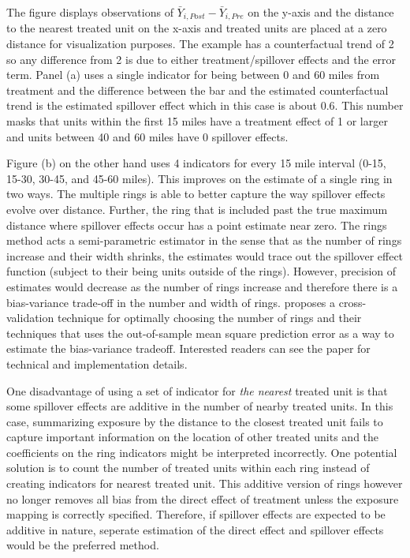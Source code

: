\documentclass[11pt]{article}
\begin{document}
\begin{figure}[tb!]
\end{figure}

The figure displays observations of $\bar{Y}_{i,Post} - \bar{Y}_{i,Pre}$ on the y-axis and the distance to the nearest treated unit on the x-axis and treated units are placed at a zero distance for visualization purposes. The example has a counterfactual trend of 2 so any difference from 2 is due to either treatment/spillover effects and the error term. Panel (a) uses a single indicator for being between 0 and 60 miles from treatment and the difference between the bar and the estimated counterfactual trend is the estimated spillover effect which in this case is about 0.6. This number masks that units within the first 15 miles have a treatment effect of 1 or larger and units between 40 and 60 miles have 0 spillover effects. 

Figure (b) on the other hand uses 4 indicators for every 15 mile interval (0-15, 15-30, 30-45, and 45-60 miles). This improves on the estimate of a single ring in two ways. The multiple rings is able to better capture the way spillover effects evolve over distance. Further, the ring that is included past the true maximum distance where spillover effects occur has a point estimate near zero. The rings method acts a semi-parametric estimator in the sense that as the number of rings increase and their width shrinks, the estimates would trace out the spillover effect function (subject to their being units outside of the rings). However, precision of estimates would decrease as the number of rings increase and therefore there is a bias-variance trade-off in the number and width of rings. \citet{Clarke_2017} proposes a cross-validation technique for optimally choosing the number of rings and their techniques that uses the out-of-sample mean square prediction error as a way to estimate the bias-variance tradeoff. Interested readers can see the paper for technical and implementation details.

One disadvantage of using a set of indicator for \textit{the nearest} treated unit is that some spillover effects are additive in the number of nearby treated units. In this case, summarizing exposure by the distance to the closest treated unit fails to capture important information on the location of other treated units and the coefficients on the ring indicators might be interpreted incorrectly. One potential solution is to count the number of treated units within each ring instead of creating indicators for nearest treated unit. This additive version of rings however no longer removes all bias from the direct effect of treatment unless the exposure mapping is correctly specified. Therefore, if spillover effects are expected to be additive in nature, seperate estimation of the direct effect and spillover effects would be the preferred method. 
\end{document}
